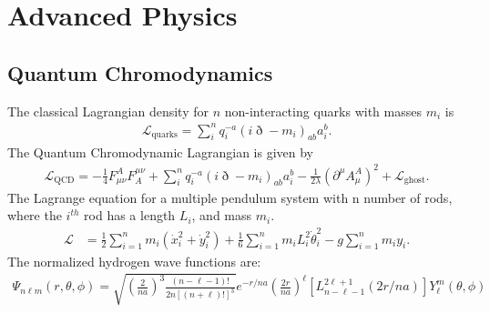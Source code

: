 \chapter{Advanced Physics}
\thispagestyle{fancy}
\section{Quantum Chromodynamics}
The classical Lagrangian density for $n$ non-interacting quarks with masses $m_i$ is 
\begin{align}
\mathcal{L}_{\textrm{quarks}}=\sum_{i}^{n}q_i^{-a}(i\eth-m_i)_{ab}a_i^b.
\end{align}
The Quantum Chromodynamic Lagrangian is given by
\begin{align}
\mathcal{L}_{\textrm{QCD}}=-\frac{1}{4}F^A_{\mu\nu}F^{\mu\nu}_A+\sum_{i}^{n}q_i^{-a}(i\eth-m_i)_{ab}a_i^b-\frac{1}{2\lambda}(\partial^\mu A^A_\mu)^2+\mathcal{L}_{\textrm{ghost}}.
\end{align}
The Lagrange equation for a multiple pendulum system with n number of rods, where the $i^{th}$ rod has a length $L_i$, and mass $m_i$.
\begin{align}
\mathcal{L}&=\frac{1}{2}\sum_{i=1}^{n}m_i(\dot{x}^2_i+\dot{y}^2_i)+\frac{1}{6}\sum_{i=1}^{n}m_iL_i^2\dot{\theta}_i^2-g\sum_{i=1}^{n}m_iy_i.
\end{align}
The normalized hydrogen wave functions are:
\begin{align}
	\Psi_{n\ell m}(r,\theta,\phi) = \sqrt{\left(\frac{2}{na}\right)^3\frac{(n-\ell-1)!}{2n[(n+\ell)!]^3}}e^{-r/na}\left(\frac{2r}{na}\right)^\ell\left[L_{n-\ell-1}^{2\ell+1}(2r/na)\right]Y_{\ell}^{m}(\theta,\phi)
\end{align}



